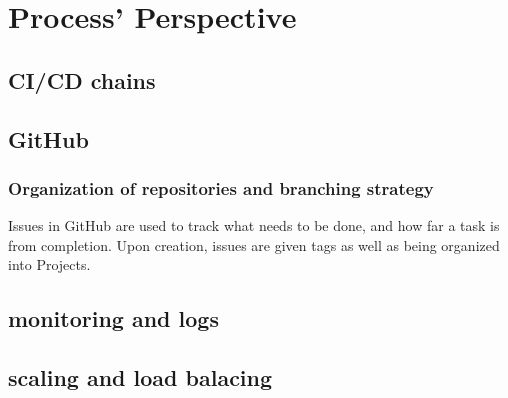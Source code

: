 \section{Process' Perspective}
\label{sec:process_perspective}



\subsection{CI/CD chains}

\subsection{GitHub}

\subsubsection{Organization of repositories and branching strategy}
Issues in GitHub are used to track what needs to be done, and how far a task is from completion. Upon creation, issues are given tags as well as being organized into Projects.


\subsection{monitoring and logs}

\subsection{scaling and load balacing}

